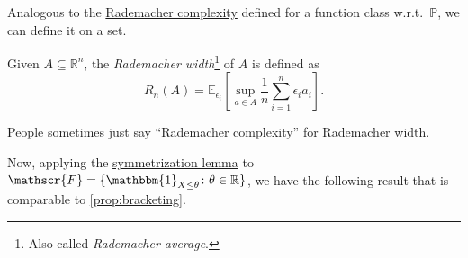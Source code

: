 Analogous to the \hyperref[def:Rademacher-complexity]{Rademacher complexity} defined for a function class w.r.t.\ \(\mathbb{P} \), we can define it on a set.

\begin{definition}\label{def:Rademacher-width}
	Given \(A \subseteq \mathbb{R} ^n\), the \emph{Rademacher width}\footnote{Also called \emph{Rademacher average}.} of \(A\) is defined as
	\[
		R_n(A) = \mathbb{E}_{\epsilon _i}\left[ \sup _{a\in A} \frac{1}{n} \sum_{i=1}^{n} \epsilon _i a_i \right].
	\]
\end{definition}

\begin{notation}
	People sometimes just say ``Rademacher complexity'' for \hyperref[def:Rademacher-width]{Rademacher width}.
\end{notation}

Now, applying the \hyperref[lma:symmetrization]{symmetrization lemma} to \(\mathscr{F} = \{ \mathbbm{1}_{X \leq \theta} \colon \theta \in \mathbb{R} \} \), we have the following result that is comparable to \autoref{prop:bracketing}.

